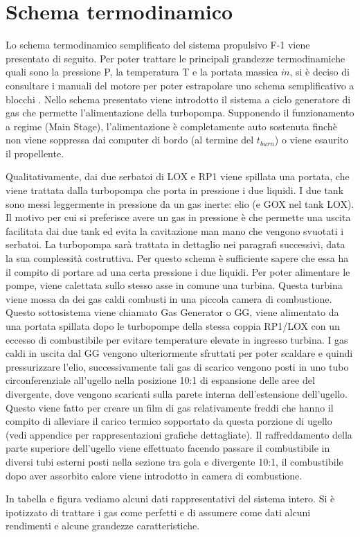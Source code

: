 \section{Schema termodinamico}
\label{sec:schema termodinamico}

Lo schema termodinamico semplificato del sistema propulsivo F-1 viene presentato di seguito. Per poter trattare le principali grandezze termodinamiche quali sono la pressione P, la temperatura T e la portata massica $ \dot{m} $, si è deciso di consultare i manuali del motore per poter estrapolare uno schema semplificativo a blocchi \cite{engine_manual}. Nello schema presentato viene introdotto il sistema a ciclo generatore di gas che permette l’alimentazione della turbopompa. Supponendo il funzionamento a regime (Main Stage), l’alimentazione è completamente auto sostenuta finchè non viene soppressa dai computer di bordo (al termine del $ t_{burn} $) o viene esaurito il propellente.

Qualitativamente, dai due serbatoi di LOX e RP1 viene spillata una portata, che viene trattata dalla turbopompa che porta in pressione i due liquidi. I due tank sono messi leggermente in pressione da un gas inerte: elio (e GOX nel tank LOX). Il motivo per cui si preferisce avere un gas in pressione è che permette una uscita facilitata dai due tank ed evita la cavitazione man mano che vengono svuotati i serbatoi. La turbopompa sarà trattata in dettaglio nei paragrafi successivi, data la sua complessità costruttiva. Per questo schema è sufficiente sapere che essa ha il compito di portare ad una certa pressione i due liquidi. Per poter alimentare le pompe, viene calettata sullo stesso asse in comune una turbina. Questa turbina viene mossa da dei gas caldi combusti in una piccola camera di combustione. Questo sottosistema viene chiamato Gas Generator o GG, viene alimentato da una portata spillata dopo le turbopompe della stessa coppia RP1/LOX con un eccesso di combustibile per evitare temperature elevate in ingresso turbina. I gas caldi in uscita dal GG vengono ulteriormente sfruttati per poter scaldare e quindi pressurizzare l’elio, successivamente tali gas di scarico vengono posti in uno tubo circonferenziale all’ugello nella posizione 10:1 di espansione delle aree del divergente, dove vengono scaricati sulla parete interna dell’estensione dell’ugello. Questo viene fatto per creare un film di gas relativamente freddi che hanno il compito di alleviare il carico termico sopportato da questa porzione di ugello (vedi appendice per rappresentazioni grafiche dettagliate). Il raffreddamento della parte superiore dell’ugello viene effettuato facendo passare il combustibile in diversi tubi esterni posti nella sezione tra gola e divergente 10:1, il combustibile dopo aver assorbito calore viene introdotto in camera di combustione.

In tabella e figura vediamo alcuni dati rappresentativi del sistema intero. Si è ipotizzato di trattare i gas come perfetti e di assumere come dati alcuni rendimenti e alcune grandezze caratteristiche.

